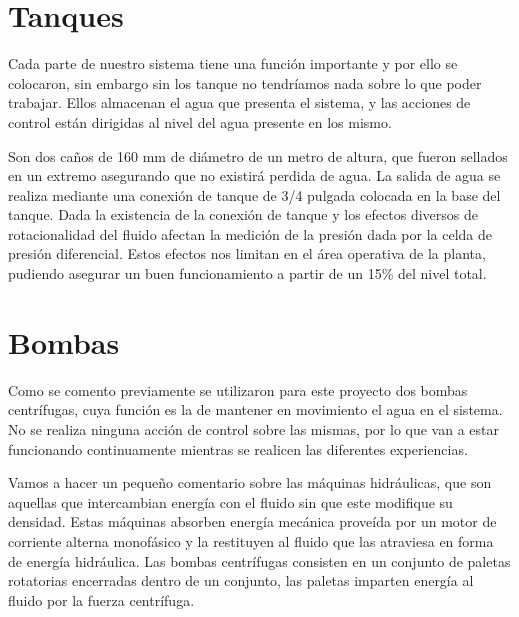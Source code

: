 \section{Tanques}
\label{sec:Tanques}

Cada parte de nuestro sistema tiene una función importante y por ello se colocaron, sin embargo sin los
tanque no tendríamos nada sobre lo que poder trabajar. Ellos almacenan el agua que presenta el sistema,
y las acciones de control están dirigidas al nivel del agua presente en los mismo.

Son dos caños de 160 mm de diámetro de un metro de altura, que fueron sellados en un extremo asegurando
que no existirá perdida de agua.
La salida de agua se realiza mediante una conexión de tanque de 3/4 pulgada colocada en la base del 
tanque.
Dada la existencia de la conexión de tanque y los efectos diversos de rotacionalidad del fluido afectan
la medición de la presión dada por la celda de presión diferencial. Estos efectos nos limitan en el 
área operativa de la planta, pudiendo asegurar un buen funcionamiento a partir de un 15\% del nivel 
total. 
\section{Bombas}
\label{sec:Bombas}
Como se comento previamente se utilizaron para este proyecto dos bombas centrífugas, cuya función es
la de mantener en movimiento el agua en el sistema. No se realiza ninguna acción de control sobre las
mismas, por lo que van a estar funcionando continuamente mientras se realicen las diferentes 
experiencias. 

Vamos a hacer un pequeño comentario sobre las máquinas hidráulicas, que son aquellas que intercambian
energía con el fluido sin que este modifique su densidad. Estas máquinas absorben energía mecánica 
proveída por un motor de corriente alterna monofásico y la restituyen al fluido que las atraviesa en
forma de  energía hidráulica. Las bombas centrífugas consisten en un conjunto de paletas rotatorias 
encerradas dentro de un conjunto, las paletas imparten energía al fluido por la fuerza centrífuga.

